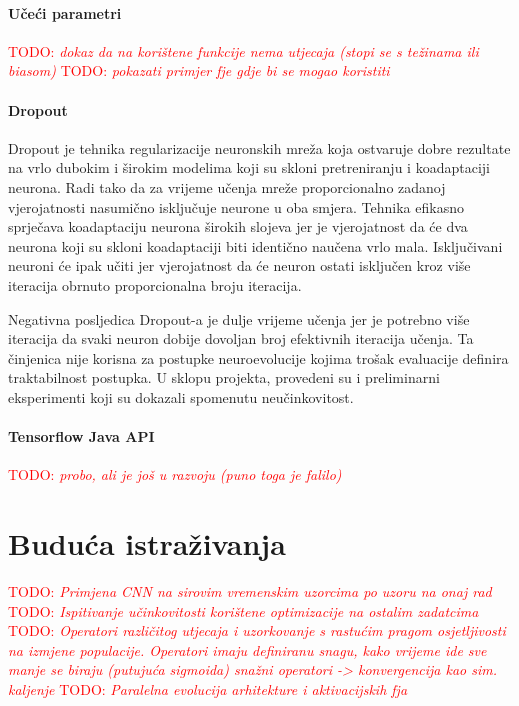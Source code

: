 \documentclass[times, utf8, numeric, diplomski]{fer}
\def\TODO#1{\noindent\textcolor{red}{TODO: \textit{#1}}\newline}
\def\todo#1{\TODO{#1}}
\begin{document}
\subsubsection{Učeći parametri}
\todo{dokaz da na korištene funkcije nema utjecaja (stopi se s težinama ili biasom)}
\todo{pokazati primjer fje gdje bi se mogao koristiti}

\subsubsection{Dropout}
Dropout \citep{dropout} je tehnika regularizacije neuronskih mreža koja ostvaruje dobre rezultate na vrlo dubokim i širokim modelima koji su skloni pretreniranju i koadaptaciji neurona. Radi tako da za vrijeme učenja mreže proporcionalno zadanoj vjerojatnosti nasumično isključuje neurone u oba smjera. Tehnika efikasno sprječava koadaptaciju neurona širokih slojeva jer je vjerojatnost da će dva neurona koji su skloni koadaptaciji biti identično naučena vrlo mala. Isključivani neuroni će ipak učiti jer vjerojatnost da će neuron ostati isključen kroz više iteracija obrnuto proporcionalna broju iteracija.

Negativna posljedica Dropout-a je dulje vrijeme učenja jer je potrebno više iteracija da svaki neuron dobije dovoljan broj efektivnih iteracija učenja. Ta činjenica nije korisna za postupke neuroevolucije kojima trošak evaluacije definira traktabilnost postupka. U sklopu projekta, provedeni su i preliminarni eksperimenti koji su dokazali spomenutu neučinkovitost.

\subsubsection{Tensorflow Java API}
\todo{probo, ali je još u razvoju (puno toga je falilo)}

\chapter{Buduća istraživanja}
\todo{Primjena CNN na sirovim vremenskim uzorcima po uzoru na onaj rad}
\todo{Ispitivanje učinkovitosti korištene optimizacije na ostalim zadatcima}
\todo{Operatori različitog utjecaja i uzorkovanje s rastućim pragom osjetljivosti na izmjene populacije. Operatori imaju definiranu snagu, kako vrijeme ide sve manje se biraju (putujuća sigmoida) snažni operatori -> konvergencija kao sim. kaljenje}
\todo{Paralelna evolucija arhitekture i aktivacijskih fja \citep{cnn_evolution}}
\end{document}
